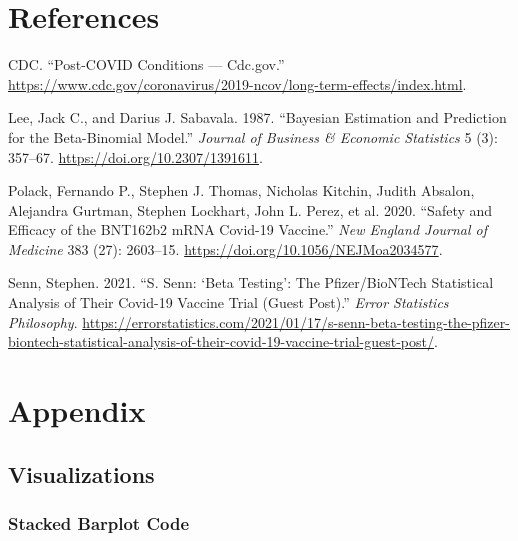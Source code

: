 \documentclass[
  11pt,
]{article}
\newlength{\cslhangindent}
\newlength{\cslentryspacingunit} %
\newenvironment{CSLReferences}[2] %
 {%
  \setlength{\parindent}{0pt}
  \ifodd #1
  \let\oldpar\par
  \def\par{\hangindent=\cslhangindent\oldpar}
  \fi
  \setlength{\parskip}{#2\cslentryspacingunit}
 }%
 {}
\begin{document}
\hypertarget{references}{%
\section{References}\label{references}}

\hypertarget{refs}{}
\begin{CSLReferences}{1}{0}
\leavevmode{}%
CDC. {``{P}ost-{C}{O}{V}{I}{D} {C}onditions --- Cdc.gov.''}
\url{https://www.cdc.gov/coronavirus/2019-ncov/long-term-effects/index.html}.

\leavevmode{}%
Lee, Jack C., and Darius J. Sabavala. 1987. {``Bayesian Estimation and
Prediction for the Beta-Binomial Model.''} \emph{Journal of Business \&
Economic Statistics} 5 (3): 357--67.
\url{https://doi.org/10.2307/1391611}.

\leavevmode{}%
Polack, Fernando P., Stephen J. Thomas, Nicholas Kitchin, Judith
Absalon, Alejandra Gurtman, Stephen Lockhart, John L. Perez, et al.
2020. {``Safety and Efficacy of the BNT162b2 mRNA Covid-19 Vaccine.''}
\emph{New England Journal of Medicine} 383 (27): 2603--15.
\url{https://doi.org/10.1056/NEJMoa2034577}.

\leavevmode{}%
Senn, Stephen. 2021. {``S. {Senn}: {`{Beta} Testing'}: {The}
{Pfizer}/{BioNTech} Statistical Analysis of Their {Covid}-19 Vaccine
Trial (Guest Post).''} \emph{Error Statistics Philosophy}.
\url{https://errorstatistics.com/2021/01/17/s-senn-beta-testing-the-pfizer-biontech-statistical-analysis-of-their-covid-19-vaccine-trial-guest-post/}.

\end{CSLReferences}

\hypertarget{appendix}{%
\section{Appendix}\label{appendix}}

\hypertarget{visualizations}{%
\subsection{Visualizations}\label{visualizations}}

\hypertarget{stacked-barplot-code}{%
\subsubsection{Stacked Barplot Code}\label{stacked-barplot-code}}
\end{document}
